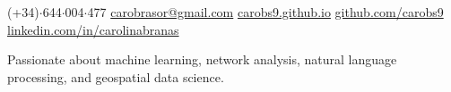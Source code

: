 \documentclass{resume}
\begin{document}
\begin{center}
    \contact
        {(+34)$\cdot$644$\cdot$004$\cdot$477}
        {\href{mailto://carobrasor@gmail.com}{carobrasor@gmail.com}}
        {\href{https://carobs9.github.io/}{carobs9.github.io}}
        {\href{https://github.com/carobs9}{github.com/carobs9}}
        {\href{https://www.linkedin.com/in/carolinabranas/}{linkedin.com/in/carolinabranas}}
\end{center}

\begin{center}
    Passionate about machine learning, network analysis, natural language processing, and geospatial data science. \\
\end{center}
\end{document}
